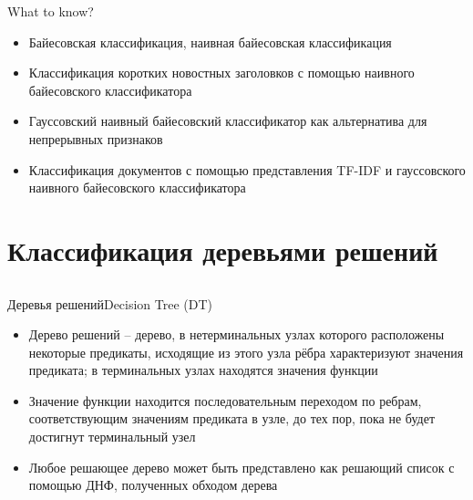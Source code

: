 \documentclass[compress,red,unicode]{beamer}
\begin{document}
\begin{frame}{What to know?}
\begin{itemize}
	\item Байесовская классификация, наивная байесовская классификация
	\item Классификация коротких новостных заголовков с помощью наивного байесовского классификатора 
	\item Гауссовский наивный байесовский классификатор как альтернатива для непрерывных признаков
	\item Классификация документов с помощью представления TF-IDF и гауссовского наивного байесовского классификатора
\end{itemize}
\end{frame}

\section{Классификация деревьями решений}
\subsection{}

\begin{frame}{Деревья решений}{Decision Tree (DT)}
\begin{itemize}
	\item Дерево решений -- дерево, в нетерминальных узлах которого расположены некоторые предикаты, исходящие из этого узла рёбра характеризуют значения предиката; в терминальных узлах находятся значения функции
	\item Значение функции находится последовательным переходом по ребрам, соответствующим значениям предиката в узле, до тех пор, пока не будет достигнут терминальный узел

	\item Любое решающее дерево может быть представлено как решающий список с помощью ДНФ, полученных обходом дерева
\end{itemize}
\end{frame}
\end{document}
